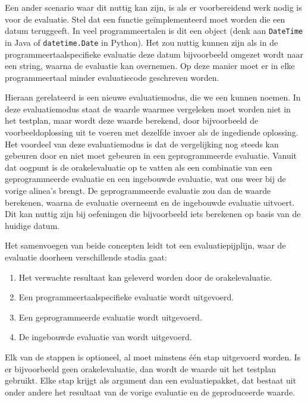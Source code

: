 Een ander scenario waar dit nuttig kan zijn, is als er voorbereidend werk nodig is voor de evaluatie.
Stel dat een functie geïmplementeerd moet worden die een datum teruggeeft.
In veel programmeertalen is dit een object (denk aan \texttt{DateTime} in Java of \texttt{datetime.Date} in Python).
Het zou nuttig kunnen zijn als in de programmeertaalspecifieke evaluatie deze datum bijvoorbeeld omgezet wordt naar een string, waarna \tested{} de evaluatie kan overnemen.
Op deze manier moet er in elke programmeertaal minder evaluatiecode geschreven worden.

Hieraan gerelateerd is een nieuwe evaluatiemodus, die we een  kunnen noemen.
In deze evaluatiemodus staat de waarde waarmee vergeleken moet worden niet in het testplan, maar wordt deze waarde berekend, door bijvoorbeeld de voorbeeldoplossing uit te voeren met dezelfde invoer als de ingediende oplossing.
Het voordeel van deze evaluatiemodus is dat de vergelijking nog steeds kan gebeuren door \tested{} en niet moet gebeuren in een geprogrammeerde evaluatie.
Vanuit dat oogpunt is de orakelevaluatie op te vatten als een combinatie van een geprogrammeerde evaluatie en een ingebouwde evaluatie, wat ons weer bij de vorige alinea's brengt.
De geprogrammeerde evaluatie zou dan de waarde berekenen, waarna \tested{} de evaluatie overneemt en de ingebouwde evaluatie uitvoert.
Dit kan nuttig zijn bij oefeningen die bijvoorbeeld iets berekenen op basis van de huidige datum.

Het samenvoegen van beide concepten leidt tot een evaluatiepijplijn, waar de evaluatie doorheen verschillende stadia gaat:

\begin{enumerate}
    \item Het verwachte resultaat kan geleverd worden door de orakelevaluatie.
    \item Een programmeertaalspecifieke evaluatie wordt uitgevoerd.
    \item Een geprogrammeerde evaluatie wordt uitgevoerd.
    \item De ingebouwde evaluatie van \tested{} wordt uitgevoerd.
\end{enumerate}

Elk van de stappen is optioneel, al moet minstens één stap uitgevoerd worden.
Is er bijvoorbeeld geen orakelevaluatie, dan wordt de waarde uit het testplan gebruikt.
Elke stap krijgt als argument dan een evaluatiepakket, dat bestaat uit onder andere het resultaat van de vorige evaluatie en de geproduceerde waarde.

